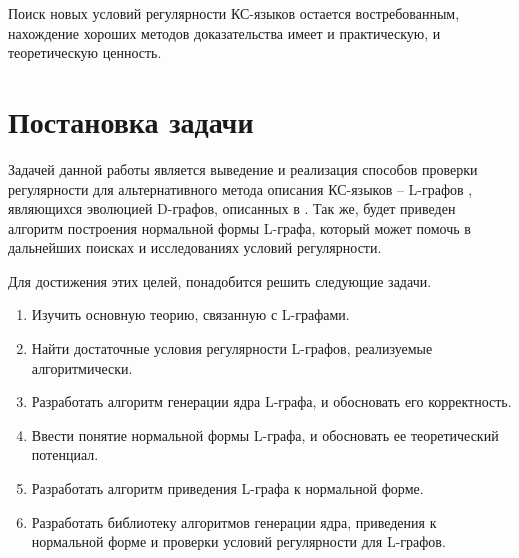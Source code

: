 Поиск новых условий регулярности КС-языков остается востребованным, нахождение
хороших методов доказательства имеет и практическую, и теоретическую ценность. 

\section{Постановка задачи}

Задачей данной работы является выведение и реализация способов проверки регулярности для альтернативного 
метода описания КС-языков -- L-графов \cite{vylitok_rostovski_o_podklassah,vylitok_sutirin_harakterizacia}, 
являющихся эволюцией D-графов, описанных в \cite{stan1}. Так же, будет приведен алгоритм построения нормальной формы
L-графа, который может помочь в дальнейших поисках и исследованиях условий регулярности.

Для достижения этих целей, понадобится решить следующие задачи.

\begin{enumerate}
    \item Изучить основную теорию, связанную с L-графами.
    \item Найти достаточные условия регулярности L-графов, реализуемые алгоритмически.
    \item Разработать алгоритм генерации ядра L-графа, и обосновать его корректность.
    \item Ввести понятие нормальной формы L-графа, и обосновать ее теоретический потенциал.
    \item Разработать алгоритм приведения L-графа к нормальной форме.
    \item Разработать библиотеку алгоритмов генерации ядра, приведения к нормальной форме и проверки условий регулярности для L-графов. 
\end{enumerate}

\clearpage

